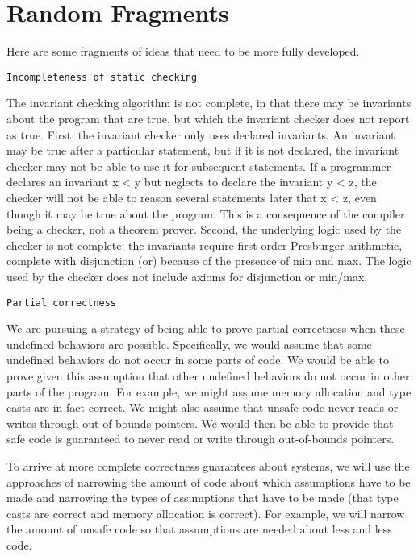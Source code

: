 

\chapter{Random Fragments}

Here are some fragments of ideas that need to be more fully developed.

\texttt{Incompleteness of static checking}

The invariant checking algorithm is not complete, in that there may be
invariants about the program that are true, but which the invariant
checker does not report as true. First, the invariant checker only uses
declared invariants. An invariant may be true after a particular
statement, but if it is not declared, the invariant checker may not be
able to use it for subsequent statements. If a programmer declares an
invariant x \textless{} y but neglects to declare the invariant y
\textless{} z, the checker will not be able to reason several statements
later that x \textless{} z, even though it may be true about the
program. This is a consequence of the compiler being a checker, not a
theorem prover. Second, the underlying logic used by the checker is not
complete: the invariants require first-order Presburger arithmetic,
complete with disjunction (or) because of the presence of min and max.
The logic used by the checker does not include axioms for disjunction or
min/max.

\texttt{Partial correctness}

We are pursuing a strategy of being able to prove partial correctness
when these undefined behaviors are possible. Specifically, we would
assume that some undefined behaviors do not occur in some parts of code.
We would be able to prove given this assumption that other undefined
behaviors do not occur in other parts of the program. For example, we
might assume memory allocation and type casts are in fact correct. We
might also assume that unsafe code never reads or writes through
out-of-bounds pointers. We would then be able to provide that safe code
is guaranteed to never read or write through out-of-bounds pointers.

To arrive at more complete correctness guarantees about systems, we will
use the approaches of narrowing the amount of code about which
assumptions have to be made and narrowing the types of assumptions that
have to be made (that type casts are correct and memory allocation is
correct). For example, we will narrow the amount of unsafe code so that
assumptions are needed about less and less code.


